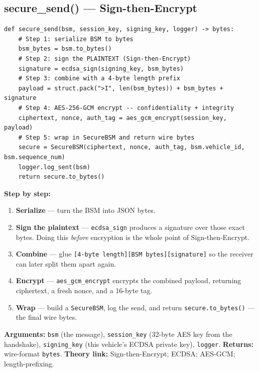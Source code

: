 \documentclass[11pt,a4paper]{report}
\begin{document}
\subsection{secure\_send() --- Sign-then-Encrypt}
\begin{lstlisting}[style=py,caption={v2v\_protocol.py --- secure\_send: the sending pipeline.}]
def secure_send(bsm, session_key, signing_key, logger) -> bytes:
    # Step 1: serialize BSM to bytes
    bsm_bytes = bsm.to_bytes()
    # Step 2: sign the PLAINTEXT (Sign-then-Encrypt)
    signature = ecdsa_sign(signing_key, bsm_bytes)
    # Step 3: combine with a 4-byte length prefix
    payload = struct.pack(">I", len(bsm_bytes)) + bsm_bytes + signature
    # Step 4: AES-256-GCM encrypt -- confidentiality + integrity
    ciphertext, nonce, auth_tag = aes_gcm_encrypt(session_key, payload)
    # Step 5: wrap in SecureBSM and return wire bytes
    secure = SecureBSM(ciphertext, nonce, auth_tag, bsm.vehicle_id, bsm.sequence_num)
    logger.log_sent(bsm)
    return secure.to_bytes()
\end{lstlisting}
\textbf{Step by step:}
\begin{enumerate}
  \item \textbf{Serialize} --- turn the BSM into JSON bytes.
  \item \textbf{Sign the plaintext} --- \texttt{ecdsa\_sign} produces a signature
        over those exact bytes. Doing this \emph{before} encryption is the whole
        point of Sign-then-Encrypt.
  \item \textbf{Combine} --- glue \texttt{[4-byte length][BSM bytes][signature]}
        so the receiver can later split them apart again.
  \item \textbf{Encrypt} --- \texttt{aes\_gcm\_encrypt} encrypts the combined
        payload, returning ciphertext, a fresh nonce, and a 16-byte tag.
  \item \textbf{Wrap} --- build a \texttt{SecureBSM}, log the send, and return
        \texttt{secure.to\_bytes()} --- the final wire bytes.
\end{enumerate}
\textbf{Arguments:} \texttt{bsm} (the message), \texttt{session\_key} (32-byte
AES key from the handshake), \texttt{signing\_key} (this vehicle's ECDSA private
key), \texttt{logger}. \textbf{Returns:} wire-format \texttt{bytes}.
\textbf{Theory link:} Sign-then-Encrypt; ECDSA; AES-GCM; length-prefixing.
\end{document}
